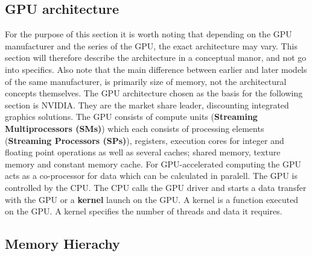 \subsection{GPU architecture}
For the purpose of this section it is worth noting that depending on the GPU manufacturer and the series of the GPU, the exact architecture may vary.
This section will therefore describe the architecture in a conceptual manor, and not go into specifics. 
Also note that the main difference between earlier and later models of the same manufacturer, is primarily size of memory, not the architectural concepts themselves.
The GPU architecture chosen as the basis for the following section is NVIDIA. 
They are the market share leader, discounting integrated graphics solutions. 
The GPU consists of compute units (\textbf{Streaming Multiprocessors (SMs)}) which each consists of processing elements (\textbf{Streaming Processors (SPs)}), registers, execution cores for integer and floating point operations as well as several caches; shared memory, texture memory and constant memory cache.
For GPU-accelerated computing the GPU acts as a co-processor for data which can be calculated in paralell.
The GPU is controlled by the CPU.
The CPU calls the GPU driver and starts a data transfer with the GPU or a \textbf{kernel} launch on the GPU.
A kernel is a function executed on the GPU. %
A kernel specifies the number of threads and data it requires.
\subsection{Memory Hierachy}

